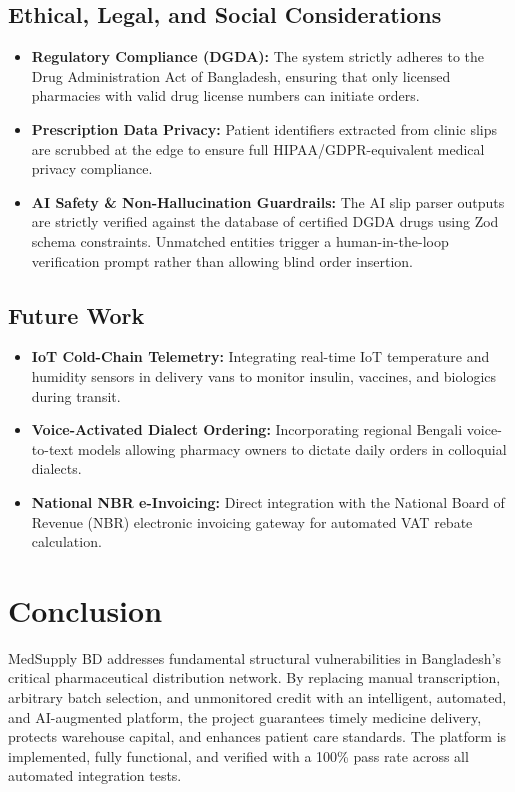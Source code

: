 \documentclass[12pt,a4paper]{article}
\begin{document}
\subsection{Ethical, Legal, and Social Considerations}
\begin{itemize}
    \item \textbf{Regulatory Compliance (DGDA):} The system strictly adheres to the Drug Administration Act of Bangladesh, ensuring that only licensed pharmacies with valid drug license numbers can initiate orders.
    \item \textbf{Prescription Data Privacy:} Patient identifiers extracted from clinic slips are scrubbed at the edge to ensure full HIPAA/GDPR-equivalent medical privacy compliance.
    \item \textbf{AI Safety \& Non-Hallucination Guardrails:} The AI slip parser outputs are strictly verified against the database of certified DGDA drugs using Zod schema constraints. Unmatched entities trigger a human-in-the-loop verification prompt rather than allowing blind order insertion.
\end{itemize}

\subsection{Future Work}
\begin{itemize}
    \item \textbf{IoT Cold-Chain Telemetry:} Integrating real-time IoT temperature and humidity sensors in delivery vans to monitor insulin, vaccines, and biologics during transit.
    \item \textbf{Voice-Activated Dialect Ordering:} Incorporating regional Bengali voice-to-text models allowing pharmacy owners to dictate daily orders in colloquial dialects.
    \item \textbf{National NBR e-Invoicing:} Direct integration with the National Board of Revenue (NBR) electronic invoicing gateway for automated VAT rebate calculation.
\end{itemize}

\section{Conclusion}
MedSupply BD addresses fundamental structural vulnerabilities in Bangladesh's critical pharmaceutical distribution network. By replacing manual transcription, arbitrary batch selection, and unmonitored credit with an intelligent, automated, and AI-augmented platform, the project guarantees timely medicine delivery, protects warehouse capital, and enhances patient care standards. The platform is implemented, fully functional, and verified with a 100\% pass rate across all automated integration tests.
\end{document}
